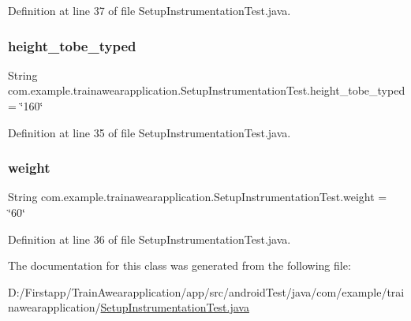 Definition at line 37 of file Setup\+Instrumentation\+Test.\+java.

\mbox{\label{classcom_1_1example_1_1trainawearapplication_1_1_setup_instrumentation_test_a969cc5898cf6bdc58207c1944f573a78}} 
\subsubsection{\texorpdfstring{height\_tobe\_typed}{height\_tobe\_typed}}
{\footnotesize\ttfamily String com.\+example.\+trainawearapplication.\+Setup\+Instrumentation\+Test.\+height\+\_\+tobe\+\_\+typed = \char`\"{}160\char`\"{}\hspace{0.3cm}{\ttfamily [private]}}



Definition at line 35 of file Setup\+Instrumentation\+Test.\+java.

\mbox{\label{classcom_1_1example_1_1trainawearapplication_1_1_setup_instrumentation_test_a09706ee1f2c90e4a5ea3edb460714adb}} 
\subsubsection{\texorpdfstring{weight}{weight}}
{\footnotesize\ttfamily String com.\+example.\+trainawearapplication.\+Setup\+Instrumentation\+Test.\+weight = \char`\"{}60\char`\"{}\hspace{0.3cm}{\ttfamily [private]}}



Definition at line 36 of file Setup\+Instrumentation\+Test.\+java.



The documentation for this class was generated from the following file\+:\begin{DoxyCompactItemize}
\item 
D\+:/\+Firstapp/\+Train\+Awearapplication/app/src/android\+Test/java/com/example/trainawearapplication/\mbox{\hyperlink{_setup_instrumentation_test_8java}{Setup\+Instrumentation\+Test.\+java}}\end{DoxyCompactItemize}
